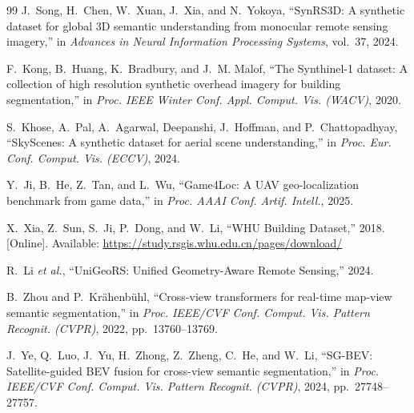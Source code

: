 \documentclass[letterpaper,journal]{IEEEtran}
\begin{document}
\begin{thebibliography}{99}
J.~Song, H.~Chen, W.~Xuan, J.~Xia, and N.~Yokoya, ``SynRS3D: A synthetic dataset for global 3D semantic understanding from monocular remote sensing imagery,'' in \textit{Advances in Neural Information Processing Systems}, vol.~37, 2024.

F.~Kong, B.~Huang, K.~Bradbury, and J.~M. Malof, ``The Synthinel-1 dataset: A collection of high resolution synthetic overhead imagery for building segmentation,'' in \textit{Proc. IEEE Winter Conf. Appl. Comput. Vis. (WACV)}, 2020.

S.~Khose, A.~Pal, A.~Agarwal, Deepanshi, J.~Hoffman, and P.~Chattopadhyay, ``SkyScenes: A synthetic dataset for aerial scene understanding,'' in \textit{Proc. Eur. Conf. Comput. Vis. (ECCV)}, 2024.

Y.~Ji, B.~He, Z.~Tan, and L.~Wu, ``Game4Loc: A UAV geo-localization benchmark from game data,'' in \textit{Proc. AAAI Conf. Artif. Intell.}, 2025.

X.~Xia, Z.~Sun, S.~Ji, P.~Dong, and W.~Li, ``WHU Building Dataset,'' 2018. [Online]. Available: \url{https://study.rsgis.whu.edu.cn/pages/download/}

R.~Li \textit{et al.}, ``UniGeoRS: Unified Geometry-Aware Remote Sensing,'' 2024.

B.~Zhou and P.~Kr\"ahenb\"uhl, ``Cross-view transformers for real-time map-view semantic segmentation,'' in \textit{Proc. IEEE/CVF Conf. Comput. Vis. Pattern Recognit. (CVPR)}, 2022, pp.~13760--13769.

J.~Ye, Q.~Luo, J.~Yu, H.~Zhong, Z.~Zheng, C.~He, and W.~Li, ``SG-BEV: Satellite-guided BEV fusion for cross-view semantic segmentation,'' in \textit{Proc. IEEE/CVF Conf. Comput. Vis. Pattern Recognit. (CVPR)}, 2024, pp.~27748--27757.

\end{thebibliography}


\vfill
\end{document}
